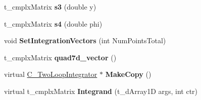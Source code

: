 \begin{DoxyCompactItemize}
\item 
\hypertarget{class_c___two_loop_integrator_ac4875e79aac1ef45354ae0d9d4b5de0a}{t\-\_\-cmplx\-Matrix {\bfseries s3} (double y)}\label{class_c___two_loop_integrator_ac4875e79aac1ef45354ae0d9d4b5de0a}

\item 
\hypertarget{class_c___two_loop_integrator_a28a6b5949e006c74dd1794795a52d490}{t\-\_\-cmplx\-Matrix {\bfseries s4} (double phi)}\label{class_c___two_loop_integrator_a28a6b5949e006c74dd1794795a52d490}

\item 
\hypertarget{class_c___two_loop_integrator_ae5d60f0d597c9914d94189efbc0524c8}{void {\bfseries Set\-Integration\-Vectors} (int Num\-Points\-Total)}\label{class_c___two_loop_integrator_ae5d60f0d597c9914d94189efbc0524c8}

\item 
\hypertarget{class_c___two_loop_integrator_aa64a1a151510b2dac2eaf2733d441f64}{t\-\_\-cmplx\-Matrix {\bfseries quad7d\-\_\-vector} ()}\label{class_c___two_loop_integrator_aa64a1a151510b2dac2eaf2733d441f64}

\item 
\hypertarget{class_c___two_loop_integrator_a4819fffa1f0346f0591b75bb9c471393}{virtual \hyperlink{class_c___two_loop_integrator}{C\-\_\-\-Two\-Loop\-Integrator} $\ast$ {\bfseries Make\-Copy} ()}\label{class_c___two_loop_integrator_a4819fffa1f0346f0591b75bb9c471393}

\item 
\hypertarget{class_c___two_loop_integrator_a1545a7f1ac277dbf10450c736b01d2cf}{virtual t\-\_\-cmplx\-Matrix {\bfseries Integrand} (t\-\_\-d\-Array1\-D args, int ctr)}\label{class_c___two_loop_integrator_a1545a7f1ac277dbf10450c736b01d2cf}

\end{DoxyCompactItemize}

